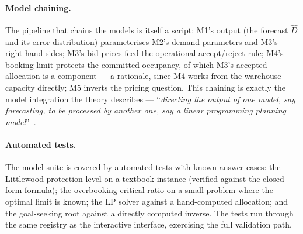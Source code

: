 \paragraph{Model chaining.}
The pipeline that chains the models is itself a script: M1's output (the forecast $\hat{D}$ and its error distribution) parameterises M2's demand parameters and M3's right-hand sides; M3's bid prices feed the operational accept/reject rule; M4's booking limit protects the committed occupancy, of which M3's accepted allocation is a component --- a rationale, since M4 works from the warehouse capacity directly; M5 inverts the pricing question. This chaining is exactly the model integration the theory describes --- ``\emph{directing the output of one model, say forecasting, to be processed by another one, say a linear programming planning model}''~\cite{turban2011}.

\paragraph{Automated tests.}
The model suite is covered by automated tests with known-answer cases: the Littlewood protection level on a textbook instance (verified against the closed-form formula); the overbooking critical ratio on a small problem where the optimal limit is known; the LP solver against a hand-computed allocation; and the goal-seeking root against a directly computed inverse. The tests run through the same registry as the interactive interface, exercising the full validation path.
